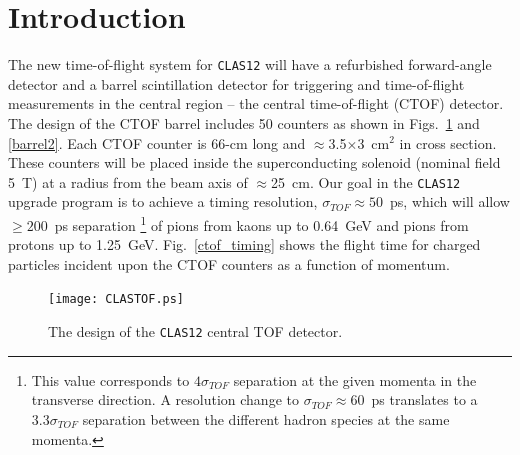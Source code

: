 \section{Introduction}

The new time-of-flight system for {\tt CLAS12} will have a refurbished 
forward-angle detector and a barrel scintillation detector for triggering 
and time-of-flight measurements in the central region -- the central 
time-of-flight (CTOF) detector.  The design of the CTOF barrel includes
50 counters as shown in Figs.~\ref{barrel} and \ref{barrel2}.  Each CTOF
counter is 66-cm long and $\approx$3.5$\times$3~cm$^2$ in cross section.  
These counters will be placed inside the superconducting solenoid (nominal 
field 5~T) at a radius from the beam axis of $\approx$25~cm.  Our goal in 
the {\tt CLAS12} upgrade program is to achieve a timing resolution, 
$\sigma_{TOF}\approx 50$~ps, which will allow $\ge 200$~ps separation
\footnote{This value corresponds to $4\sigma_{TOF}$ separation at the given 
momenta in the transverse direction.  A resolution change to 
$\sigma_{TOF}\approx 60$~ps translates to a $3.3\sigma_{TOF}$ separation between 
the different hadron species at the same momenta.} of pions from kaons up to 
0.64~GeV and pions from protons up to 1.25~GeV.  Fig.~\ref{ctof_timing} shows
the flight time for charged particles incident upon the CTOF counters as
a function of momentum.

\begin{figure}[htbp]
\centering
\texttt{[image: CLASTOF.ps]}
\caption{\small{The design of the {\tt CLAS12} central TOF detector.}}
\label{barrel}
\end{figure}


